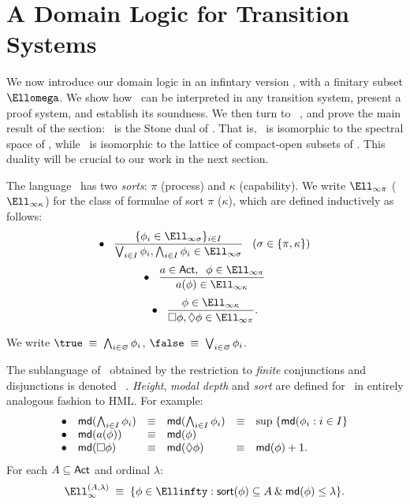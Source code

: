 \section{A Domain Logic for Transition Systems} 
We now introduce our domain logic in an infintary version \Ellinfty, with
a finitary subset $\Ellomega$. 
We show how \Ellinfty\ can be interpreted in any transition system,
present a proof system, and establish its soundness. 
We then turn to \Ellomega\ , and prove the main result of the section:
\Ellomega\ is the Stone dual of \Dom. That is, \Dom\ is isomorphic to
the spectral space of \Ellomega, while \Ellomega\ is isomorphic to the
lattice of compact-open subsets of \Dom. 
This duality will be crucial to our work in the next section. 

\begin{definition} 
{\rm The language \Ellinfty\ has two {\em sorts}: $\pi$ (process) and
$\kappa$ (capability). We write $\Ell_{\infty \pi}$ ($\Ell_{\infty
\kappa}$) for the class of formulae of sort $\pi$ ($\kappa$), which are
defined inductively as follows:} 
\[ \bullet \;\;\; \frac{\{\phi_{i} \in \Ell_{\infty \sigma} \}_{i \in
I}}{\bigvee_{i \in I}\phi_{i} , \bigwedge_{i \in I}\phi_{i} \in \Ell_{\infty
\sigma}} \;\;\; (\sigma \in \{ \pi , \kappa \}) \] 
\[ \bullet \;\;\; \frac{a \in {\sf Act}, \;\; \phi \in \Ell_{\infty \pi}}{a(\phi ) \in
\Ell_{\infty \kappa}} \]
\[ \bullet \;\;\; \frac{\phi \in \Ell_{\infty \kappa}}{\Box \phi , \Diamond
\phi \in \Ell_{\infty \pi}} . \] 
\end{definition} 

 We write $\true \; \equiv \;  \bigwedge_{i \in
\varnothing} \phi_{i}$, $\false \; \equiv \; \bigvee_{i \in \varnothing}
\phi_{i}$. 

The sublanguage of \Ellinfty\ obtained by the restriction to {\em finite}
conjunctions and disjunctions is denoted \Ellomega\ . {\em Height}, {\em
modal depth} and {\em sort} are defined for \Ell\ in entirely analogous
fashion to HML. 
For example: 
\[ \begin{array}{llllll} 
\bullet & {\sf md}(\bigwedge_{i \in I}\phi_{i}) & \equiv & {\sf md}(\bigwedge_{i \in
I}\phi_{i}) & \equiv & \sup \; \{ {\sf md}(\phi_{i} : i \in I \} \\ 
\bullet & {\sf md}(a(\phi )) & \equiv & {\sf md}(\phi ) & & \\ 
\bullet & {\sf md}(\Box \phi ) & \equiv & {\sf md}(\Diamond \phi ) & \equiv & {\sf md}(\phi
) + 1 . 
\end{array} \] 
For each $A \subseteq {\sf Act}$ and ordinal $\lambda$: 
\[ {\Ell}^{(A, \lambda )}_{\infty} \; \equiv \; \{ \phi \in \Ellinfty :
{\sf sort}(\phi ) \subseteq A \: \& \: {\sf md}(\phi ) \leq \lambda \} . \] 

